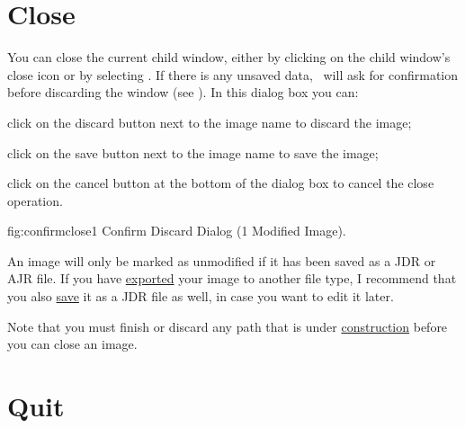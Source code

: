 \section{Close}\label{sec:closeimage}


You can close the current child window, either by clicking on the
child window's close icon or by selecting .
If there is any unsaved data, \FlowframTk\ will ask for confirmation
before discarding the window (see ).
In this dialog box you can:

\begin{deflist}

\begin{itemdesc}
click on the discard button next to the image name to discard the
image;
\end{itemdesc}


\begin{itemdesc}
click on the save button next to the image name to save the image;
\end{itemdesc}


\begin{itemdesc}
click on the cancel button at the bottom of the dialog box to cancel
the close operation.
\end{itemdesc}

\end{deflist}

\FloatFig
  {fig:confirmclose1}
  {}
  {Confirm Discard Dialog (1 Modified Image).}

An image will only be marked as unmodified if it has been saved as a
\gls{JDR} or \gls{AJR} file.  If you have
\hyperref[sec:exportimage]{exported} your image to another file
type, I recommend that you also \hyperref[sec:saveimage]{save} it as
a \gls{JDR} file as well, in case you want to edit it later.

Note that you must finish or discard any \gls{path} that is under
\hyperref[sec:newobjects]{construction} before you can close
an image.

\section{Quit}\label{sec:quit}

